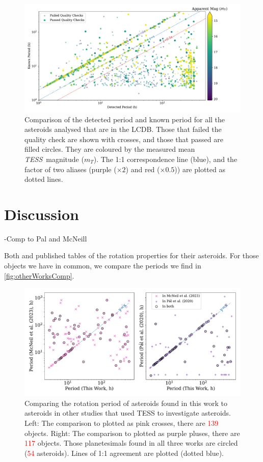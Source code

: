 \documentclass[12pt]{article}
\newcommand{\tess}{\textit{TESS}}
\newcommand{\red}[1]{\textcolor{red}{#1}}
\begin{document}
\begin{figure}
    \centering
    \includegraphics[width=\textwidth]{LCDBCompTotalPaperFigDraft.pdf}
    \caption{Comparison of the detected period and known period for all the asteroids analysed that are in the LCDB.
        Those that failed the quality check are shown with crosses, and those that passed are filled circles. They are coloured by the measured mean \tess\ magnitude ($m_T$).
        The 1:1 correspondence line (blue), and the factor of two aliases (purple ($\times 2$) and red ($\times 0.5$)) are plotted as dotted lines.
    }
    \label{fig:LCDBComp}
\end{figure}



\section{Discussion} \label{sec:Dis}

-Comp to Pal and McNeill

Both \citet{Pal2020} and \citet{McNeill2023} published tables of the rotation properties for their asteroids.
For those objects we have in common, we compare the periods we find in \autoref{fig:otherWorksComp}.


\begin{figure}
    \centering
    \includegraphics[width=\textwidth]{M23andP20CompPaperFigDraft.pdf}
    \caption{Comparing the rotation period of asteroids found in this work to asteroids in other studies that used TESS to investigate asteroids.
        Left: The comparison to \citet{McNeill2023} plotted as pink crosses, there are \red{139} objects.
        Right: The comparison to \citet{Pal2020} plotted as purple pluses, there are \red{117} objects.
        Those planetesimals found in all three works are circled (\red{54} asteroids).
        Lines of 1:1 agreement are plotted (dotted blue).}
    \label{fig:otherWorksComp}
\end{figure}
\end{document}
